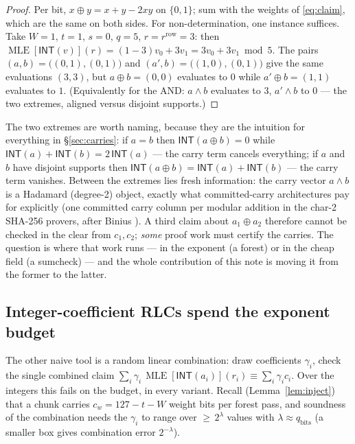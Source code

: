 \documentclass[11pt]{article}
\newcommand{\bits}{\{0,1\}}
\newcommand{\INT}{\mathsf{INT}}
\newcommand{\cw}{c_w}
\DeclareMathOperator{\MLE}{MLE}
\theoremstyle{plain}
\theoremstyle{definition}
\theoremstyle{remark}
\begin{document}
\begin{proof}
Per bit, $x\oplus y = x+y-2xy$ on $\bits$; sum with the weights of
\eqref{eq:claim}, which are the same on both sides. For non-determination,
one instance suffices. Take $W=1$, $t=1$, $s=0$, $q=5$, $r=r^{\mathrm{row}}=3$:
then $\MLE[\INT(v)](r) = (1-3)v_0+3v_1 = 3v_0+3v_1 \bmod 5$. The pairs
$(a,b)=\bigl((0,1),(0,1)\bigr)$ and $(a',b)=\bigl((1,0),(0,1)\bigr)$ give the
same evaluations $(3,3)$, but $a\oplus b = (0,0)$ evaluates to $0$ while
$a'\oplus b=(1,1)$ evaluates to $1$. (Equivalently for the AND: $a\wedge b$
evaluates to $3$, $a'\wedge b$ to $0$ --- the two extremes, aligned versus
disjoint supports.)
\end{proof}

The two extremes are worth naming, because they are the intuition for
everything in \S\ref{sec:carries}: if $a=b$ then $\INT(a\oplus b)=0$ while
$\INT(a)+\INT(b)=2\,\INT(a)$ --- the carry term cancels everything; if $a$ and
$b$ have disjoint supports then $\INT(a\oplus b)=\INT(a)+\INT(b)$ --- the
carry term vanishes. Between the extremes lies fresh information: the carry
vector $a\wedge b$ is a Hadamard (degree-2) object, exactly what committed-carry
architectures pay for explicitly (one committed carry column per modular
addition in the char-2 SHA-256 provers, after Binius \cite{Binius}). A third
claim about $a_1\oplus a_2$ therefore cannot be checked in the clear from
$c_1,c_2$; \emph{some} proof work must certify the carries. The question is
where that work runs --- in the exponent (a forest) or in the cheap field (a
sumcheck) --- and the whole contribution of this note is moving it from the
former to the latter.

\subsection{Integer-coefficient RLCs spend the exponent budget}\label{sec:intrlc}

The other naive tool is a random linear combination: draw coefficients
$\gamma_i$, check the single combined claim
$\sum_i\gamma_i\,\MLE[\INT(a_i)](r_i) \equiv \sum_i\gamma_i c_i$. Over the
integers this fails on the budget, in every variant. Recall
(Lemma~\ref{lem:inject}) that a chunk carries $\cw = 127-t-W$ weight bits per
forest pass, and soundness of the combination needs the $\gamma_i$ to range
over ${\ge}\,2^{\lambda}$ values with $\lambda\approx q_{\mathrm{bits}}$
(a smaller box gives combination error $2^{-\lambda}$).
\end{document}
